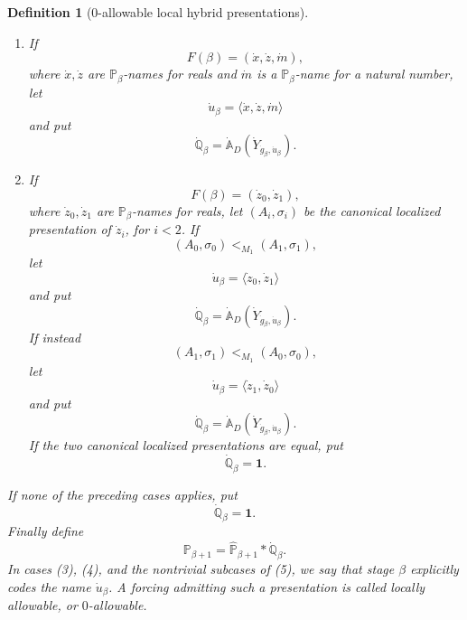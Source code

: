 \documentclass[10pt,a4paper]{amsart}
\newtheorem{definition}{Definition}
\begin{document}
\begin{definition}[\(0\)-allowable local hybrid presentations]
\begin{enumerate}
   \item If
   \[
      F(\beta)=(\dot x,\dot z,\dot m),
   \]
   where \(\dot x,\dot z\) are \(\mathbb P_\beta\)-names for reals and
   \(\dot m\) is a \(\mathbb P_\beta\)-name for a natural number, let
   \[
      \dot u_\beta=\langle \dot x,\dot z,\dot m\rangle
   \]
   and put
   \[
      \dot{\mathbb Q}_\beta
      =
      \dot{\mathbb A}_D(\dot Y_{\dot g_\beta,\dot u_\beta}).
   \]

   \item If
   \[
      F(\beta)=(\dot z_0,\dot z_1),
   \]
   where \(\dot z_0,\dot z_1\) are \(\mathbb P_\beta\)-names for reals, let
   \((A_i,\sigma_i)\) be the canonical localized presentation of \(\dot z_i\),
   for \(i<2\).  If
   \[
      (A_0,\sigma_0)<_{M_1}(A_1,\sigma_1),
   \]
   let
   \[
      \dot u_\beta=\langle \dot z_0,\dot z_1\rangle
   \]
   and put
   \[
      \dot{\mathbb Q}_\beta
      =
      \dot{\mathbb A}_D(\dot Y_{\dot g_\beta,\dot u_\beta}).
   \]
   If instead
   \[
      (A_1,\sigma_1)<_{M_1}(A_0,\sigma_0),
   \]
   let
   \[
      \dot u_\beta=\langle \dot z_1,\dot z_0\rangle
   \]
   and put
   \[
      \dot{\mathbb Q}_\beta
      =
      \dot{\mathbb A}_D(\dot Y_{\dot g_\beta,\dot u_\beta}).
   \]
   If the two canonical localized presentations are equal, put
   \[
      \dot{\mathbb Q}_\beta=\mathbf 1.
   \]
\end{enumerate}
If none of the preceding cases applies, put
\[
   \dot{\mathbb Q}_\beta=\mathbf 1.
\]
Finally define
\[
   \mathbb P_{\beta+1}
      =
   \widehat{\mathbb P}_{\beta+1}*\dot{\mathbb Q}_\beta.
\]
In cases (3), (4), and the nontrivial subcases of (5), we say that stage
\(\beta\) \emph{explicitly codes} the name \(\dot u_\beta\).  A forcing
admitting such a presentation is called \emph{locally allowable}, or
\emph{\(0\)-allowable}.
\end{definition}
\end{document}
